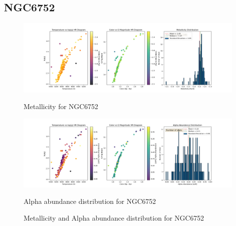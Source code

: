 \documentclass[a4paper,12pt]{article}
\begin{document}
\subsection{NGC6752}
\begin{figure}[H]
    \centering
    \begin{minipage}[b]{0.8\textwidth}
        \centering
        \includegraphics[width=\textwidth]{NGC6752_metalicity.png}
        \caption{Metallicity for NGC6752}
        \label{fig:NGC6752_metalicity}
    \end{minipage}
    \hfill
    \begin{minipage}[b]{0.8\textwidth}
        \centering
        \includegraphics[width=\textwidth]{NGC6752_alpha.png}
        \caption{Alpha abundance distribution for NGC6752}
        \label{fig:NGC6752_alpha}
    \end{minipage}
    \caption{Metallicity and Alpha abundance distribution for NGC6752}
    \label{fig:NGC6752_combined}
\end{figure}
\clearpage
\end{document}
